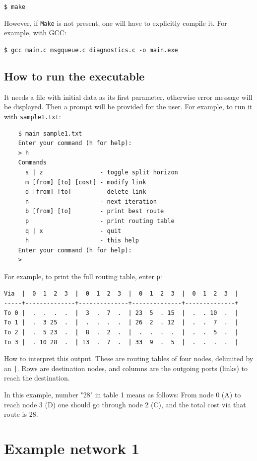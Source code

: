 \documentclass[english,11pt]{article}
\newcommand{\ok}{\fontsize{9}{11}\selectfont}
\begin{document}
\texttt{\$ make}

However, if \texttt{Make} is not present, one will have to explicitly compile
it. For example, with GCC:

\texttt{\$ gcc main.c msgqueue.c diagnostics.c -o main.exe}

\subsection{How to run the executable}

It needs a file with initial data as its first parameter, otherwise error
message will be displayed. Then a prompt will be provided for the user. For
example, to run it with \texttt{sample1.txt}:

{\ok
\begin{verbatim}
    $ main sample1.txt
    Enter your command (h for help):
    > h
    Commands
      s | z                - toggle split horizon
      m [from] [to] [cost] - modify link
      d [from] [to]        - delete link
      n                    - next iteration
      b [from] [to]        - print best route
      p                    - print routing table
      q | x                - quit
      h                    - this help
    Enter your command (h for help):
    >
\end{verbatim}
}

For example, to print the full routing table, enter \texttt{p}:

{\ok
\begin{verbatim}
Via  |  0  1  2  3  |  0  1  2  3  |  0  1  2  3  |  0  1  2  3  |
-----+--------------+--------------+--------------+--------------+
To 0 |  .  .  .  .  |  3  .  7  .  | 23  5  . 15  |  .  . 10  .  |
To 1 |  .  3 25  .  |  .  .  .  .  | 26  2  . 12  |  .  .  7  .  |
To 2 |  .  5 23  .  |  8  .  2  .  |  .  .  .  .  |  .  .  5  .  |
To 3 |  . 10 28  .  | 13  .  7  .  | 33  9  .  5  |  .  .  .  .  |
\end{verbatim}
}

How to interpret this output. These are routing tables of four nodes, delimited
by an \texttt{|}. Rows are destination nodes, and columns are the outgoing ports
(links) to reach the destination.

In this example, number "28" in table 1 means as follows: From node 0 (A) to
reach node 3 (D) one should go through node 2 (C), and the total cost via that
route is 28.

\section{Example network 1}
\end{document}
